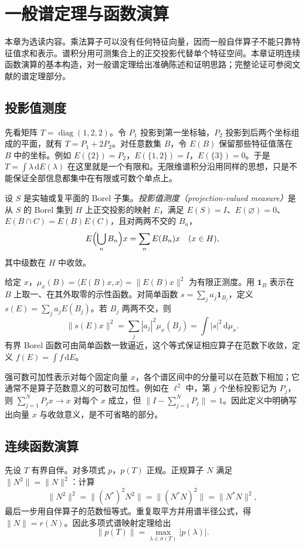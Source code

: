 \setcounter{chapter}{15} %
\chapter{一般谱定理与函数演算}
\label{chap:fa-general-spectral}

本章为选读内容。乘法算子可以没有任何特征向量，因而一般自伴算子不能只靠特征值求和表示。谱积分用可测集合上的正交投影代替单个特征空间。本章证明连续函数演算的基本构造，对一般谱定理给出准确陈述和证明思路；完整论证可参阅文献\cite{teschl}的谱定理部分。

\section{投影值测度}
先看矩阵 $T=\operatorname{diag}(1,2,2)$。令 $P_1$ 投影到第一坐标轴，$P_2$ 投影到后两个坐标组成的平面，就有 $T=P_1+2P_2$。对任意数集 $B$，令 $E(B)$ 保留那些特征值落在 $B$ 中的坐标。例如 $E(\{2\})=P_2$，$E(\{1,2\})=I$，$E(\{3\})=0$。于是 $T=\int\lambda\,\mathrm dE(\lambda)$ 在这里就是一个有限和。无限维谱积分沿用同样的思想，只是不能保证全部信息都集中在有限或可数个单点上。

\begin{definition}
设 $S$ 是实轴或复平面的 Borel 子集。\emph{投影值测度（projection-valued measure）}是从 $S$ 的 Borel 集到 $H$ 上正交投影的映射 $E$，满足 $E(S)=I$、$E(\varnothing)=0$、$E(B\cap C)=E(B)E(C)$，且对两两不交的 $B_n$，
\[
 E\Bigl(\bigcup_nB_n\Bigr)x=\sum_nE(B_n)x\quad(x\in H),
\]
其中级数在 $H$ 中收敛。
\end{definition}
给定 $x$，$\mu_x(B)=\langle E(B)x,x\rangle=\|E(B)x\|^2$ 为有限正测度。用 $\mathbf1_B$ 表示在 $B$ 上取一、在其外取零的示性函数。对简单函数 $s=\sum_ja_j\mathbf1_{B_j}$，定义 $s(E)=\sum_ja_jE(B_j)$。若 $B_j$ 两两不交，则
\[
 \|s(E)x\|^2=\sum_j|a_j|^2\mu_x(B_j)=\int|s|^2\,\mathrm d\mu_x.
\]
有界 Borel 函数可由简单函数一致逼近，这个等式保证相应算子在范数下收敛，定义 $f(E)=\int f\,\mathrm dE$。

强可数可加性表示对每个固定向量 $x$，各个谱区间中的分量可以在范数下相加；它通常不是算子范数意义的可数可加性。例如在 $\ell^2$ 中，第 $j$ 个坐标投影记为 $P_j$，则 $\sum_{j=1}^NP_jx\to x$ 对每个 $x$ 成立，但 $\|I-\sum_{j=1}^NP_j\|=1$。因此定义中明确写出向量 $x$ 与收敛意义，是不可省略的部分。

\section{连续函数演算}
先设 $T$ 有界自伴。对多项式 $p$，$p(T)$ 正规。正规算子 $N$ 满足 $\|N^2\|=\|N\|^2$：计算
\[
 \|N^2\|^2=\|(N^*)^2N^2\|=\|(N^*N)^2\|=\|N^*N\|^2,
\]
最后一步用自伴算子的范数恒等式。重复取平方并用谱半径公式，得 $\|N\|=r(N)$。因此多项式谱映射定理给出
\[
 \|p(T)\|=\max_{\lambda\in\sigma(T)}|p(\lambda)|.
\]

